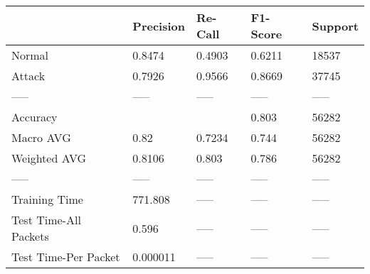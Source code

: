 \begin{tabular}{lllll}
\toprule
{} & Precision & Re-Call & F1-Score & Support \\
\midrule
Normal                &    0.8474 &  0.4903 &   0.6211 &   18537 \\
Attack                &    0.7926 &  0.9566 &   0.8669 &   37745 \\
-----                 &     ----- &   ----- &    ----- &   ----- \\
Accuracy              &           &         &    0.803 &   56282 \\
Macro AVG             &      0.82 &  0.7234 &    0.744 &   56282 \\
Weighted AVG          &    0.8106 &   0.803 &    0.786 &   56282 \\
-----                 &     ----- &   ----- &    ----- &   ----- \\
Training Time         &   771.808 &   ----- &    ----- &   ----- \\
Test Time-All Packets &     0.596 &   ----- &    ----- &   ----- \\
Test Time-Per Packet  &  0.000011 &   ----- &    ----- &   ----- \\
\bottomrule
\end{tabular}
